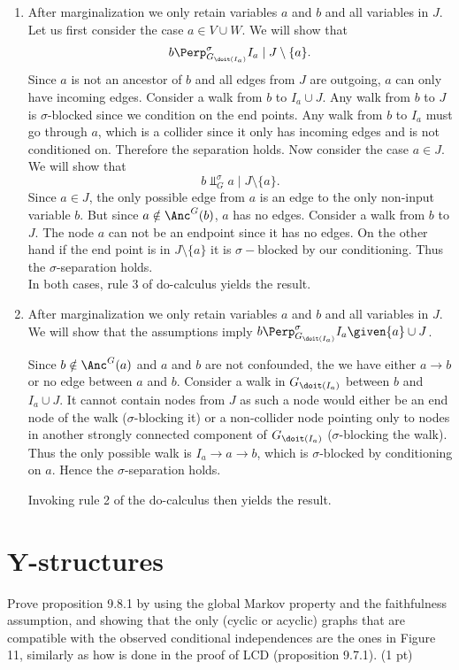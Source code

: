 {\begin{gradedsolution}
\begin{enumerate}
	\item After marginalization we only retain variables $a$ and $b$ and all variables in $J$. Let us first consider the case $a \in V \cup W$. We will show that 
	$$b \Perp^\sigma_{G_{\doit(I_a)}} I_a \mid J \setminus \{a\}.$$
	Since $a$ is not an ancestor of $b$ and all edges from $J$ are outgoing, $a$ can only have incoming edges. Consider a walk from $b$ to $I_a \cup J$. Any walk from $b$ to $J$ is $\sigma$-blocked since we condition on the end points. Any walk from $b$ to $I_a$ must go through $a$, which is a collider since it only has incoming edges and is not conditioned on. Therefore the separation holds.
	Now consider the case $a \in J$. We will show that
	$$b \Perp^\sigma_{G} a \mid J \setminus \{a\}.$$
	Since $a \in J$, the only possible edge from $a$ is an edge to the only non-input variable $b$. But since $a \notin \Anc^G(b)$, $a$ has no edges. Consider a walk from $b$ to $J$. The node $a$ can not be an endpoint since it has no edges. On the other hand if the end point is in $J \setminus \{a\}$ it is $\sigma-$blocked by our conditioning. Thus the $\sigma$-separation holds.\\
	In both cases, rule 3 of do-calculus yields the result.
	\item After marginalization we only retain variables $a$ and $b$ and all variables in $J$. We will show that the assumptions imply $b \Perp^\sigma_{G_{\doit(I_a)}} I_a \given \{a\} \cup J$.
	
	Since $b \notin \Anc^G(a)$ and $a$ and $b$ are not confounded, the we have either $a \to b$ or no edge between $a$ and $b$. Consider a walk in $G_{\doit(I_a)}$ between $b$ and $I_a \cup J$. It cannot contain nodes from $J$ as such a node would either be an end node of the walk ($\sigma$-blocking it) or a non-collider node pointing only to nodes in another strongly connected component of $G_{\doit(I_a)}$
	($\sigma$-blocking the walk). Thus the only possible walk is $I_a \to a \to b$, which is $\sigma$-blocked by conditioning on $a$. Hence the $\sigma$-separation holds.

	Invoking rule 2 of the do-calculus then yields the result.
\end{enumerate}
\end{gradedsolution}

\section{Y-structures}
Prove proposition 9.8.1 by using the global Markov property and the faithfulness assumption, and showing that the only (cyclic or acyclic) graphs that are compatible with the observed
conditional independences are the ones in Figure 11, similarly as how is done in the proof of LCD (proposition  9.7.1). (1 pt)

}
